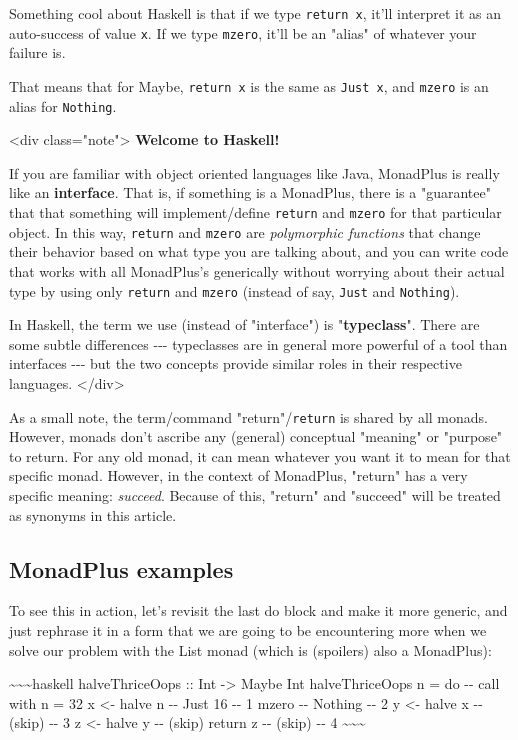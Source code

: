 \documentclass[]{article}
\begin{document}
Something cool about Haskell is that if we type \texttt{return\ x}, it'll
interpret it as an auto-success of value \texttt{x}. If we type \texttt{mzero},
it'll be an "alias" of whatever your failure is.

That means that for Maybe, \texttt{return\ x} is the same as \texttt{Just\ x},
and \texttt{mzero} is an alias for \texttt{Nothing}.

\textless{}div class="note"\textgreater{} \textbf{Welcome to Haskell!}

If you are familiar with object oriented languages like Java, MonadPlus is
really like an \textbf{interface}. That is, if something is a MonadPlus, there
is a "guarantee" that that something will implement/define \texttt{return} and
\texttt{mzero} for that particular object. In this way, \texttt{return} and
\texttt{mzero} are \emph{polymorphic functions} that change their behavior based
on what type you are talking about, and you can write code that works with all
MonadPlus's generically without worrying about their actual type by using only
\texttt{return} and \texttt{mzero} (instead of say, \texttt{Just} and
\texttt{Nothing}).

In Haskell, the term we use (instead of "interface") is "\textbf{typeclass}".
There are some subtle differences -\/-\/- typeclasses are in general more
powerful of a tool than interfaces -\/-\/- but the two concepts provide similar
roles in their respective languages. \textless{}/div\textgreater{}

As a small note, the term/command "return"/\texttt{return} is shared by all
monads. However, monads don't ascribe any (general) conceptual "meaning" or
"purpose" to return. For any old monad, it can mean whatever you want it to mean
for that specific monad. However, in the context of MonadPlus, "return" has a
very specific meaning: \emph{succeed}. Because of this, "return" and "succeed"
will be treated as synonyms in this article.

\subsection{MonadPlus examples}

To see this in action, let's revisit the last do block and make it more generic,
and just rephrase it in a form that we are going to be encountering more when we
solve our problem with the List monad (which is (spoilers) also a MonadPlus):

\textasciitilde{}\textasciitilde{}\textasciitilde{}haskell halveThriceOops ::
Int -\textgreater{} Maybe Int halveThriceOops n = do -\/- call with n = 32 x
\textless{}- halve n -\/- Just 16 -\/- 1 mzero -\/- Nothing -\/- 2 y
\textless{}- halve x -\/- (skip) -\/- 3 z \textless{}- halve y -\/- (skip)
return z -\/- (skip) -\/- 4 \textasciitilde{}\textasciitilde{}\textasciitilde{}
\end{document}
